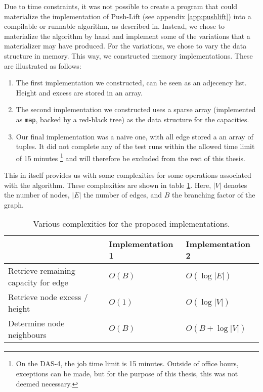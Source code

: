 Due to time constraints, it was not possible to create a program that could materialize the \forelem implementation of Push-Lift (see appendix \ref{app:pushlift}) into a compilable or runnable algorithm, as described in. %
Instead, we chose to materialize the algorithm by hand and implement some of the variations that a materializer may have produced. For the variations, we chose to vary the data structure in memory. This way, we constructed %
memory implementations. These are illustrated as follows:

\begin{enumerate}
	\item The first implementation we constructed, can be seen as an adjecency list. Height and excess are stored in an array.
	\item The second implementation we constructed uses a sparse array (implemented as \texttt{map}, backed by a red-black tree) as the data structure for the capacities.
	\item Our final implementation was a naive one, with all edge stored a an array of tuples. It did not complete any of the test runs within the allowed time limit of 15 minutes \footnote{On the DAS-4, the job time limit is 15 minutes. Outside of office hours, exceptions can be made, but for the purpose of this thesis, this was not deemed necessary.} and will therefore be excluded from the rest of this thesis.
\end{enumerate}

This in itself provides us with some complexities for some operations associated with the algorithm. These complexities are shown in table \ref{tab:implementation-complexities}. Here, $|V|$ denotes the number of nodes, $|E|$ the number of edges, and $B$ the branching factor of the graph.

\begin{table}
\centering
\begin{tabular}{l||l|l}

	& Implementation 1 & Implementation 2 \\
\hline
Retrieve remaining capacity for edge & $O(B)$ & $O(\log |E|)$ \\
Retrieve node excess / height & $O(1)$ & $O(\log |V|)$ \\
Determine node neighbours & $O(B)$ & $O(B + \log |V|)$
\end{tabular}
\caption{Various complexities for the proposed implementations.}
\label{tab:implementation-complexities}
\end{table}